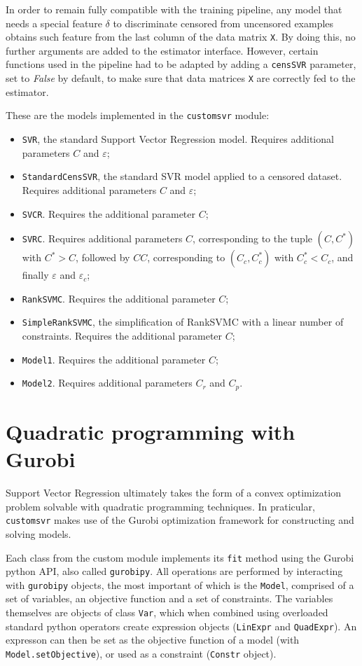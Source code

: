 \documentclass[12pt]{report}
\begin{document}
In order to remain fully compatible with the training pipeline, any model that needs a special feature $\delta$ to discriminate censored from uncensored examples obtains such feature from the last column of the data matrix \texttt{X}. By doing this, no further arguments are added to the estimator interface. However, certain functions used in the pipeline had to be adapted by adding a \texttt{censSVR} parameter, set to \textit{False} by default, to make sure that data matrices \texttt{X} are correctly fed to the estimator.

These are the models implemented in the \texttt{customsvr} module:
\begin{itemize}
\item \texttt{SVR}, the standard Support Vector Regression model. Requires additional parameters $C$ and $\varepsilon$;
\item \texttt{StandardCensSVR}, the standard SVR model applied to a censored dataset. Requires additional parameters $C$ and $\varepsilon$;
\item \texttt{SVCR}. Requires the additional parameter $C$;
\item \texttt{SVRC}. Requires additional parameters $C$, corresponding to the tuple $(C,C^{*})$ with $C^{*} > C$, followed by $CC$, corresponding to $(C_{c},C_{c}^{*})$ with $C_{c}^{*} < C_{c}$, and finally $\varepsilon$ and $\varepsilon_{c}$;
\item \texttt{RankSVMC}. Requires the additional parameter $C$;
\item \texttt{SimpleRankSVMC}, the simplification of RankSVMC with a linear number of constraints. Requires the additional parameter $C$;
\item \texttt{Model1}. Requires the additional parameter $C$;
\item \texttt{Model2}. Requires additional parameters $C_{r}$ and $C_{p}$.
\end{itemize}

\section{Quadratic programming with Gurobi}
Support Vector Regression ultimately takes the form of a convex optimization problem solvable with quadratic programming techniques. In praticular, \texttt{customsvr} makes use of the Gurobi optimization framework for constructing and solving models.

Each class from the custom module implements its \texttt{fit} method using the Gurobi python API, also called \texttt{gurobipy}. All operations are performed by interacting with \texttt{gurobipy} objects, the most important of which is the \texttt{Model}, comprised of a set of variables, an objective function and a set of constraints. The variables themselves are objects of class \texttt{Var}, which when combined using overloaded standard python operators create expression objects (\texttt{LinExpr} and \texttt{QuadExpr}). An expresson can then be set as the objective function of a model (with \texttt{Model.setObjective}), or used as a constraint (\texttt{Constr} object).
\end{document}
